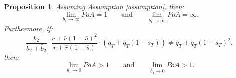 \documentclass[11pt]{article}
\newtheorem{proposition}{Proposition}
\begin{document}
\begin{proposition}\label{prop:b1_b1bar}
	Assuming Assumption \ref{assumption}, then:
	\begin{equation*}
	\lim_{b_1 \to \infty} PoA = 1 \qquad \text{and} \qquad\lim_{\bar{b}_1 \to \infty} PoA =\infty.
	\end{equation*}	
	Furthermore, if:
	\begin{equation*}
	\frac{b_2}{b_2+\bar{b}_2}\cdot \frac{r + \bar{r}(1- \bar{s})^2}{r + \bar{r}(1-\bar{s})}\cdot (q_T+\bar{q}_T(1-s_T)) \neq q_T+\bar{q}_T(1-s_T)^2,
	\end{equation*}
	then:
	\begin{equation*}
	    \lim_{b_1 \to 0} PoA > 1\qquad \text{and} \qquad \lim_{\bar{b}_1 \to 0} PoA > 1.
	\end{equation*}
\end{proposition}
\end{document}
